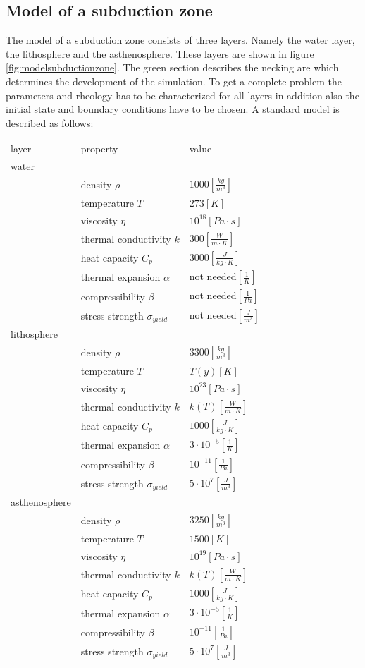 \documentclass[12pt]{scrartcl}
\begin{document}
\subsection{Model of a subduction zone}
The model of a subduction zone consists of three layers. Namely the water layer, the lithosphere and the asthenosphere. These layers are shown in figure \ref{fig:modelsubductionzone}. The green section describes the necking are which determines the development of the simulation. To get a complete problem the parameters and rheology has to be characterized for all layers in addition also the initial state and boundary conditions have to be chosen. A standard model is described as follows:\\
\begin{tabular}{lll}
layer&property&value\\
water&&\\
&density $\rho$&$1000 [\frac{kg}{m^3}]$\\
&temperature $T$&$273[K]$\\
&viscosity $\eta$&$10^{18} [Pa\cdot s]$\\
&thermal conductivity $k$&$300 [\frac{W}{m\cdot K}]$\\
&heat capacity $C_p$&$3000 [\frac{J}{kg\cdot K}]$\\
&thermal expansion $\alpha$&not needed$[\frac{1}{K}]$\\
&compressibility $\beta$&not needed$[\frac{1}{Pa}]$\\
&stress strength $\sigma_{yield}$&not needed$[\frac{J}{m^3}]$ \\
lithosphere&&\\
&density $\rho$&$3300 [\frac{kg}{m^3}]$\\
&temperature $T$&$T(y) [K]$\\
&viscosity $\eta$&$10^{23} [Pa\cdot s]$\\
&thermal conductivity $k$&$k(T) [\frac{W}{m\cdot K}]$\\
&heat capacity $C_p$&$1000 [\frac{J}{kg\cdot K}]$\\
&thermal expansion $\alpha$&$3\cdot10^{-5}[\frac{1}{K}]$\\
&compressibility $\beta$&$10^{-11}[\frac{1}{Pa}]$\\
&stress strength $\sigma_{yield}$&$5\cdot 10^7[\frac{J}{m^3}]$ \\
asthenosphere&&\\
&density $\rho$&$3250 [\frac{kg}{m^3}]$\\
&temperature $T$&$1500 [K]$\\
&viscosity $\eta$&$10^{19} [Pa\cdot s]$\\
&thermal conductivity $k$&$k(T) [\frac{W}{m\cdot K}]$\\
&heat capacity $C_p$&$1000 [\frac{J}{kg\cdot K}]$\\
&thermal expansion $\alpha$&$3\cdot10^{-5}[\frac{1}{K}]$\\
&compressibility $\beta$&$10^{-11}[\frac{1}{Pa}]$\\
&stress strength $\sigma_{yield}$&$5\cdot 10^7[\frac{J}{m^3}]$ \\
\end{tabular}
\end{document}
